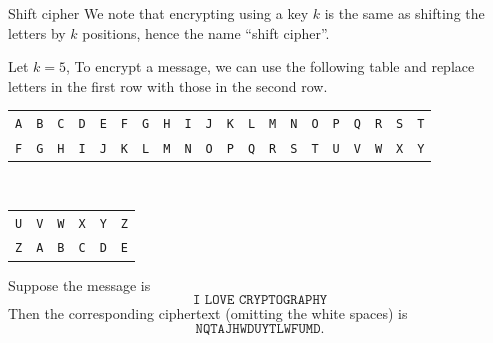 \begin{frame}{Shift cipher}
We note that encrypting using a key $k$ is the same as shifting the letters by $k$ positions, hence the name ``shift cipher''.
\begin{example}
Let $k=5$, 
To encrypt a message, we can use the following table and replace letters in the first row with those in the second row.
\begin{table}
\centering
\begin{tabular}{cccccccccccccccccccc}
\texttt{A} & \texttt{B}& \texttt{C} & \texttt{D} & \texttt{E} & \texttt{F}  & \texttt{G} & \texttt{H} & \texttt{I} & \texttt{J} & \texttt{K}  & \texttt{L}  & \texttt{M}  & \texttt{N}  & \texttt{O}  & \texttt{P}  & \texttt{Q}   & \texttt{R}  & \texttt{S}  & \texttt{T}   \\
\texttt{F}  & \texttt{G} & \texttt{H} & \texttt{I} & \texttt{J} & \texttt{K} & \texttt{L} & \texttt{M} & \texttt{N} & \texttt{O} & \texttt{P} & \texttt{Q}  & \texttt{R} & \texttt{S} & \texttt{T} & \texttt{U} & \texttt{V} & \texttt{W} & \texttt{X} & \texttt{Y} 
\end{tabular}\\\vspace{0.3cm}
\begin{tabular}{cccccc}
 \texttt{U}  & \texttt{V}  & \texttt{W}  & \texttt{X}  & \texttt{Y}  & \texttt{Z}  \\
\texttt{Z} & \texttt{A} & \texttt{B}& \texttt{C} & \texttt{D} & \texttt{E}
\end{tabular}
\end{table}
Suppose the message is 
\[
\texttt{I LOVE CRYPTOGRAPHY}
\]
Then the corresponding ciphertext (omitting the white spaces) is 
\[
\texttt{NQTAJHWDUYTLWFUMD}.
\]
\end{example}
\end{frame}

